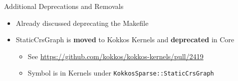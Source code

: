 \begin{frame}[fragile]{Additional Deprecations and Removals}
  \begin{itemize}
    \item Already discussed deprecating the Makefile
    \item StaticCrsGraph is \textbf{moved} to Kokkos Kernels and \textbf{deprecated} in Core
    \begin{itemize}
      \item See \url{https://github.com/kokkos/kokkos-kernels/pull/2419}
      \item Symbol is in Kernels under \texttt{KokkosSparse::StaticCrsGraph}
    \end{itemize}
  \end{itemize}
\end{frame}




%        




